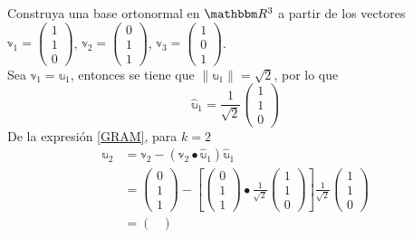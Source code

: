 \begin{example}
    Construya una base ortonormal en $\RR[3]$ a partir de los vectores $\mathbb{v}_1 = \begin{pmatrix} 1 \\ 1 \\ 0 \end{pmatrix}$, $\mathbb{v}_2 = \begin{pmatrix} 0 \\ 1 \\ 1 \end{pmatrix}$, $\mathbb{v}_3 = \begin{pmatrix} 1 \\ 0 \\ 1 \end{pmatrix}$. \\
    \solucion Sea $\mathbb{v}_1 = \mathbb{u}_1$, entonces se tiene que $\| \mathbb{u}_1 \| = \sqrt{2}$, por lo que
    $$\hat{\mathbb{u}}_1 = \frac{1}{\sqrt{2}} \begin{pmatrix}
        1 \\
        1 \\
        0
    \end{pmatrix}$$
    De la expresión \eqref{GRAM}, para $k = 2$
    \begin{align*}
        \mathbb{u}_2 & = \mathbb{v}_2 - (\mathbb{v}_2 \bullet \hat{\mathbb{u}}_1)\hat{\mathbb{u}}_1 \\
        & = \begin{pmatrix}
            0 \\
            1 \\
            1
        \end{pmatrix} - \left[ \begin{pmatrix}
            0 \\
            1 \\
            1
        \end{pmatrix} \bullet \frac{1}{\sqrt{2}} \begin{pmatrix}
            1 \\
            1 \\
            0
        \end{pmatrix} \right] \frac{1}{\sqrt{2}} \begin{pmatrix}
            1 \\
            1 \\
            0
        \end{pmatrix} \\
        & =\begin{pmatrix}

\end{pmatrix}
\end{align*}
\end{example}
